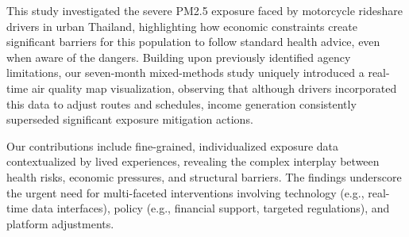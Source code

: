 \documentclass[sigconf,screen,natbib=true]{acmart}
\begin{document}
This study investigated the severe PM2.5 exposure faced by motorcycle rideshare drivers in urban Thailand, 
highlighting how economic constraints create significant barriers for this population to follow standard health advice, even when aware of the dangers.
Building upon previously identified agency limitations, our seven-month mixed-methods study uniquely introduced a real-time air quality map visualization,
observing that although drivers incorporated this data to adjust routes and schedules,
income generation consistently superseded significant exposure mitigation actions.


Our contributions include fine-grained, individualized exposure data contextualized by lived experiences, revealing the complex interplay between health risks, economic pressures, and structural barriers.
The findings underscore the urgent need for multi-faceted interventions involving technology (e.g., real-time data interfaces), policy (e.g., financial support, targeted regulations), and platform adjustments.



\end{document}

